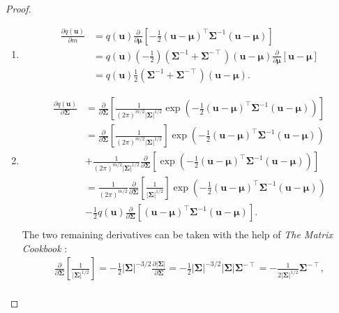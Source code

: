 \documentclass{article}
\theoremstyle{definition}
\theoremstyle{remark}
\newcommand{\dm}{\frac{\partial}{\partial\bm\mu}}
\newcommand{\dS}{\frac{\partial}{\partial\bm\Sigma}}
\begin{document}
\begin{proof}
  \leavevmode
  \begin{enumerate}
  \item
    \[
      \begin{split}
        \frac{\partial q(\mathbf{u})}{\partial m} &=
        q(\mathbf{u})\dm\left[-\frac{1}{2}(\mathbf{u} -
          \bm\mu)^\intercal\bm\Sigma^{-1}(\mathbf{u} - \bm\mu)\right]
        \\
        &= q(\mathbf{u})\left(-\frac{1}{2}\right)(\bm\Sigma^{-1} +
        \bm\Sigma^{-\intercal})(\mathbf{u} - \bm\mu)\dm[\mathbf{u} -
        \bm\mu] \\
        &= q(\mathbf{u})\frac{1}{2}(\bm\Sigma^{-1} +
        \bm\Sigma^{-\intercal})(\mathbf{u} - \bm\mu).
      \end{split}
    \]
  \item
    \[
      \begin{split}
        \frac{\partial q(\mathbf{u})}{\partial \bm\Sigma} &=
        \dS\left[\frac{1}{(2\pi)^{m/2}|\bm\Sigma|^{1/2}}\exp \left( -\frac{1}{2}
            (\mathbf{u} - \bm\mu)^\intercal\bm\Sigma^{-1}(\mathbf{u} -
            \bm\mu)\right)\right] \\
        &= \dS\left[\frac{1}{(2\pi)^{m/2}|\bm\Sigma|^{1/2}}\right]\exp \left( -\frac{1}{2}
          (\mathbf{u} - \bm\mu)^\intercal\bm\Sigma^{-1}(\mathbf{u} -
          \bm\mu)\right) \\
        &+ \frac{1}{(2\pi)^{m/2}|\bm\Sigma|^{1/2}}\dS\left[\exp\left( -\frac{1}{2}
            (\mathbf{u} - \bm\mu)^\intercal\bm\Sigma^{-1}(\mathbf{u} -
            \bm\mu)\right)\right] \\
        &=
        \frac{1}{(2\pi)^{m/2}}\dS\left[\frac{1}{|\bm\Sigma|^{1/2}}\right]\exp
        \left( -\frac{1}{2} (\mathbf{u} -
          \bm\mu)^\intercal\bm\Sigma^{-1}(\mathbf{u} - \bm\mu)\right) \\
        &- \frac{1}{2}q(\mathbf{u})\dS[(\mathbf{u}
        - \bm\mu)^\intercal\bm\Sigma^{-1}(\mathbf{u} - \bm\mu)]. \\
      \end{split}
    \]
    The two remaining derivatives can be taken with the help of \emph{The Matrix
      Cookbook} \cite{petersen2008matrix}:
    \begin{gather*}
      \dS\left[\frac{1}{|\bm\Sigma|^{1/2}}\right] =
      -\frac{1}{2}|\bm\Sigma|^{-3/2}\frac{\partial |\bm\Sigma|}{\partial \bm\Sigma} =
      -\frac{1}{2}|\bm\Sigma|^{-3/2}|\bm\Sigma|\bm\Sigma^{-\intercal} = -\frac{1}{2|\bm\Sigma|^{1/2}}\bm\Sigma^{-\intercal}, \\

\end{gather*}
\end{enumerate}
\end{proof}
\end{document}

